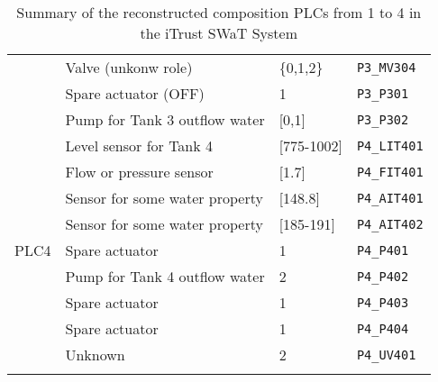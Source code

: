 {\begin{longtable}[c]{p{} p{} p{} p{}}
		& Valve (unkonw role) & \{0,1,2\} & \texttt{P3\_MV304} \\
		& Spare actuator (OFF) & 1 & \texttt{P3\_P301} \\
		& Pump for Tank 3 outflow water & [0,1] & \texttt{P3\_P302} \\
		\hline
		\multirow{9}{12em}{PLC4} & Level sensor for Tank 4 & [775-1002] & \texttt{P4\_LIT401} \\
		& Flow or pressure sensor & [1.7] & \texttt{P4\_FIT401} \\
		& Sensor for some water property & [148.8] & \texttt{P4\_AIT401} \\
		& Sensor for some water property & [185-191] & \texttt{P4\_AIT402} \\
		& Spare actuator & 1 & \texttt{P4\_P401} \\
		& Pump for Tank 4 outflow water & 2 & \texttt{P4\_P402} \\
		& Spare actuator & 1 & \texttt{P4\_P403} \\
		& Spare actuator & 1 & \texttt{P4\_P404} \\
		& Unknown & 2 & \texttt{P4\_UV401} \\
		\hline
		
		\caption{Summary of the reconstructed composition PLCs from 1 to 4 in the iTrust SWaT System}
		\label{table:6_plc_registers_summary}
	\end{longtable}
}
\vfill
\nolinenumbers